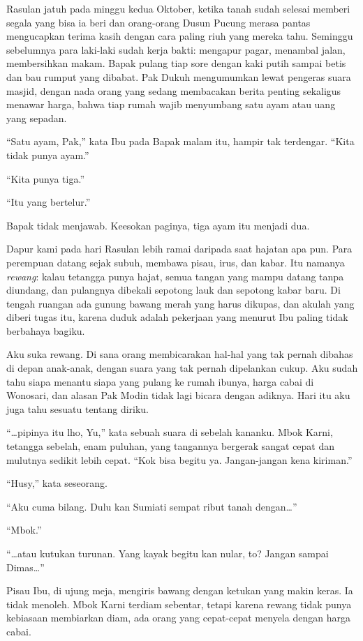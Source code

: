 \documentclass[11pt,twoside,openany]{book}
\makeatletter
\newcommand{\scenebreak}{\par\vspace{0.9em}{\centering\textsc{*\hspace{0.7em}*\hspace{0.7em}*}\par}\vspace{0.9em}\@afterindentfalse\@afterheading}
\makeatother
\begin{document}
Rasulan jatuh pada minggu kedua Oktober, ketika tanah sudah selesai memberi segala yang bisa ia beri dan orang-orang Dusun Pucung merasa pantas mengucapkan terima kasih dengan cara paling riuh yang mereka tahu. Seminggu sebelumnya para laki-laki sudah kerja bakti: mengapur pagar, menambal jalan, membersihkan makam. Bapak pulang tiap sore dengan kaki putih sampai betis dan bau rumput yang dibabat. Pak Dukuh mengumumkan lewat pengeras suara masjid, dengan nada orang yang sedang membacakan berita penting sekaligus menawar harga, bahwa tiap rumah wajib menyumbang satu ayam atau uang yang sepadan.

``Satu ayam, Pak,'' kata Ibu pada Bapak malam itu, hampir tak terdengar. ``Kita tidak punya ayam.''

``Kita punya tiga.''

``Itu yang bertelur.''

Bapak tidak menjawab. Keesokan paginya, tiga ayam itu menjadi dua.

\scenebreak
Dapur kami pada hari Rasulan lebih ramai daripada saat hajatan apa pun. Para perempuan datang sejak subuh, membawa pisau, irus, dan kabar. Itu namanya \emph{rewang}: kalau tetangga punya hajat, semua tangan yang mampu datang tanpa diundang, dan pulangnya dibekali sepotong lauk dan sepotong kabar baru. Di tengah ruangan ada gunung bawang merah yang harus dikupas, dan akulah yang diberi tugas itu, karena duduk adalah pekerjaan yang menurut Ibu paling tidak berbahaya bagiku.

Aku suka rewang. Di sana orang membicarakan hal-hal yang tak pernah dibahas di depan anak-anak, dengan suara yang tak pernah dipelankan cukup. Aku sudah tahu siapa menantu siapa yang pulang ke rumah ibunya, harga cabai di Wonosari, dan alasan Pak Modin tidak lagi bicara dengan adiknya. Hari itu aku juga tahu sesuatu tentang diriku.

``\ldots pipinya itu lho, Yu,'' kata sebuah suara di sebelah kananku. Mbok Karni, tetangga sebelah, enam puluhan, yang tangannya bergerak sangat cepat dan mulutnya sedikit lebih cepat. ``Kok bisa begitu ya. Jangan-jangan kena kiriman.''

``Husy,'' kata seseorang.

``Aku cuma bilang. Dulu kan Sumiati sempat ribut tanah dengan\ldots{}''

``Mbok.''

``\ldots atau kutukan turunan. Yang kayak begitu kan nular, to? Jangan sampai Dimas\ldots{}''

Pisau Ibu, di ujung meja, mengiris bawang dengan ketukan yang makin keras. Ia tidak menoleh. Mbok Karni terdiam sebentar, tetapi karena rewang tidak punya kebiasaan membiarkan diam, ada orang yang cepat-cepat menyela dengan harga cabai.
\end{document}
